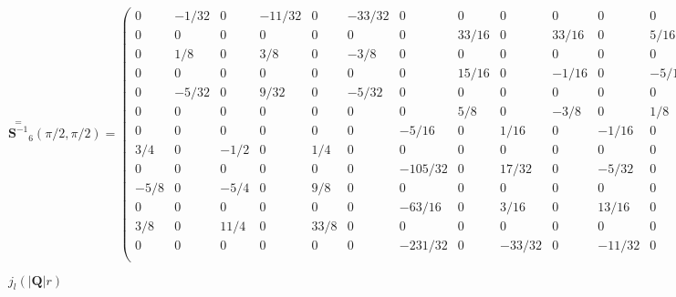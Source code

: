 \documentclass[twoside]{article}
\def\lthtmlcheckvsize{\ifdim\ht\sizebox<\vsize 
  \ifdim\wd\sizebox<\hsize\expandafter\hfill\fi \expandafter\vfill
  \else\expandafter\vss\fi}%
\begin{document}
{\newpage\clearpage
{}%
$\displaystyle
 \stackrel{=}{\mathbf S^{-1}}_6(\pi/2,\pi/2) = \left(
\begin{array}{ccccccccccccc}
   0 &  -1/32 &      0 & -11/32 &      0 & -33/32 &      0 &      0 &      0 &      0 &      %
0 &      0 &      0 \\
   0 &      0 &      0 &      0 &      0 &      0 &      0 &  33/16 &      0 &  33/16 &      %
0 &   5/16 &      0 \\
   0 &    1/8 &      0 &    3/8 &      0 &   -3/8 &      0 &      0 &      0 &      0 &      %
0 &      0 &      0 \\
   0 &      0 &      0 &      0 &      0 &      0 &      0 &  15/16 &      0 &  -1/16 &      %
0 &  -5/16 &      0 \\
   0 &  -5/32 &      0 &   9/32 &      0 &  -5/32 &      0 &      0 &      0 &      0 &      %
0 &      0 &      0 \\
   0 &      0 &      0 &      0 &      0 &      0 &      0 &    5/8 &      0 &   -3/8 &      %
0 &    1/8 &      0 \\
   0 &      0 &      0 &      0 &      0 &      0 &  -5/16 &      0 &   1/16 &      0 &  %
-1/16 &      0 &   1/16 \\
 3/4 &      0 &   -1/2 &      0 &    1/4 &      0 &      0 &      0 &      0 &      0 &      %
0 &      0 &      0 \\
   0 &      0 &      0 &      0 &      0 &      0 &-105/32 &      0 &  17/32 &      0 &  %
-5/32 &      0 & -15/32 \\
-5/8 &      0 &   -5/4 &      0 &    9/8 &      0 &      0 &      0 &      0 &      0 &      %
0 &      0 &      0 \\
   0 &      0 &      0 &      0 &      0 &      0 & -63/16 &      0 &   3/16 &      0 &  %
13/16 &      0 &   3/16 \\
 3/8 &      0 &   11/4 &      0 &   33/8 &      0 &      0 &      0 &      0 &      0 &      %
0 &      0 &      0 \\
   0 &      0 &      0 &      0 &      0 &      0 &-231/32 &      0 & -33/32 &      0 & %
-11/32 &      0 &  -1/32 \\
\end{array} \right)
$%
\lthtmlindisplaymathZ
\lthtmlcheckvsize\clearpage}

{\newpage\clearpage
{}%
$j_l(|\mathbf Q|r)$%
\lthtmlindisplaymathZ
\lthtmlcheckvsize\clearpage}
\end{document}
